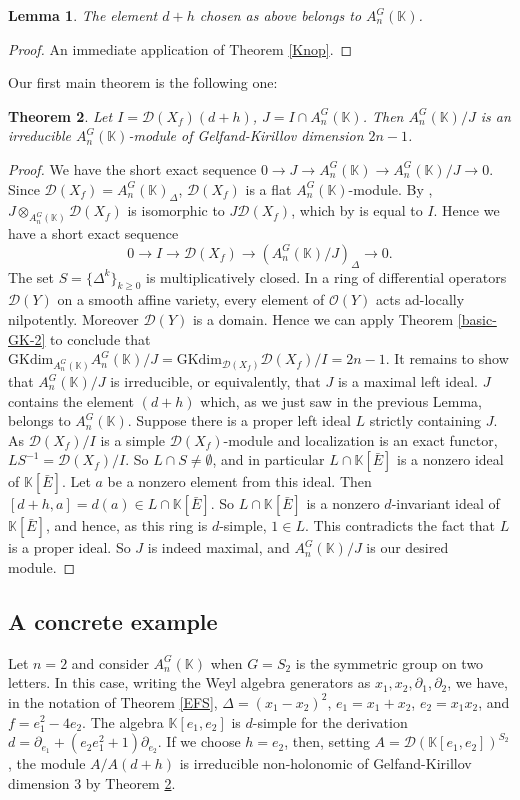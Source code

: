 \documentclass[12pt, a4paper]{amsart}
\newtheorem{theorem}{Theorem}[section]
\newtheorem{lemma}[theorem]{Lemma}
\newcommand{\Invar}{A_n^G(\mathbb{K})}           %
\newcommand{\GKdim}{\text{GKdim}}    %
\def\D{\mathcal D}
\def\KK{\mathbb K}
\begin{document}
\begin{lemma}
The element $d+h$ chosen as above belongs to $\Invar$.
\end{lemma}
\begin{proof}
    An immediate application of Theorem \ref{Knop}.
\end{proof}
Our first main theorem is the following one:
\begin{theorem}\label{irred-non-hol-invar-Weyl}
Let $I=\D(X_f)(d+h)$, $J=I\cap \Invar$. Then $\Invar/J$ is an irreducible $\Invar$-module of Gelfand-Kirillov dimension $2n-1$.
\end{theorem}
\begin{proof}
We have the short exact sequence $0 \rightarrow J \rightarrow \Invar \rightarrow \Invar/J \rightarrow 0$. Since $\D(X_f)=\Invar_\Delta$, $\D(X_f)$ is a flat $\Invar$-module. By \cite[4.12]{Lam2}, $J \otimes_{\Invar} \D(X_f)$ is isomorphic to $J \D(X_f)$, which by \cite[Proposition 2.1.16(iii)]{McConnell} is equal to $I$. Hence we have a short exact sequence
\[ 0 \rightarrow I \rightarrow \D(X_f) \rightarrow (\Invar/J )_\Delta \rightarrow 0.\]
The set $S=\{ \Delta^k \}_{k \geq 0}$ is multiplicatively closed. In a ring of differential operators $\D(Y)$ on a smooth affine variety, every element of $\mathcal{O}(Y)$ acts ad-locally nilpotently. Moreover $\D(Y)$ is a domain. Hence we can apply Theorem \ref{basic-GK-2} to conclude that $\GKdim_{\Invar} \Invar / J = \GKdim_{ \D(X_f)} \D(X_f)/I=2n-1$.
It remains to show that $\Invar / J$ is irreducible, or equivalently, that $J$ is a maximal left ideal. $J$ contains the element $(d+h)$ which, as we just saw in the previous Lemma, belongs to $\Invar$. Suppose there is a proper left ideal $L$ strictly containing $J$. As $\D(X_f)/I$ is a simple $\D(X_f)$-module and localization is an exact functor, $LS^{-1}= \D(X_f)/I$. So $L \cap S \neq \emptyset$, and in particular $L \cap \KK[\bar{E}]$ is a nonzero ideal of $\KK[\bar{E}]$. Let $a$ be a nonzero element from this ideal. Then $[d+h,a]=d(a) \in L \cap \KK[\bar{E}]$. So $L \cap \KK[\bar{E}]$ is a nonzero $d$-invariant ideal of $\KK[\bar{E}]$, and hence, as this ring is $d$-simple, $1 \in L$. This contradicts the fact that $L$ is a proper ideal. So $J$ is indeed maximal, and $\Invar/J$ is our desired module.
\end{proof}
\subsection{A concrete example}
\label{concrete_example}
Let $n=2$ and consider $\Invar$ when $G=S_2$ is the symmetric group on two letters. In this case, writing the Weyl algebra generators as $x_1, x_2, \partial_1, \partial_2$, we have, in the notation of Theorem \ref{EFS}, $\Delta=(x_1-x_2)^2$, $e_1= x_1+x_2$, $e_2=x_1x_2$, and $f=e_1^2-4e_2$.
The algebra $\KK[e_1,e_2]$ is $d$-simple for the derivation $d=\partial_{e_1} +(e_2e_1^2+1)\partial_{e_2}$. If we choose $h=e_2$, then, setting $A=\D(\KK[e_1,e_2])^{S_2}$, the module $A/A(d+h)$ is irreducible non-holonomic of Gelfand-Kirillov dimension $3$ by Theorem \ref{irred-non-hol-invar-Weyl}.
\end{document}
